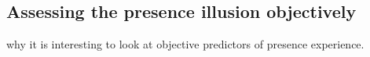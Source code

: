 \subsection{Assessing the presence illusion objectively}
why it is interesting to look at objective predictors of presence experience.

